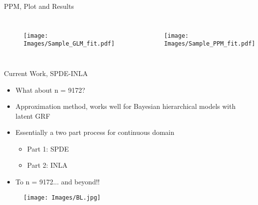 \documentclass{beamer}
\begin{document}
\begin{frame}{PPM, Plot and Results}

\begin{columns}

  \begin{figure}[H]
	\centering
	\texttt{[image: Images/Sample\_GLM\_fit.pdf]}
	\end{figure}
	
  \begin{figure}[H]
	\centering
	\texttt{[image: Images/Sample\_PPM\_fit.pdf]}
	\end{figure}

\end{columns}
\end{frame}

\begin{frame}{Current Work, SPDE-INLA}

\begin{itemize}
\addtolength{\itemsep}{0.5\baselineskip}
\item What about n = 9172?
\item Approximation method, works well for Bayesian hierarchical models with latent GRF
\item Essentially a two part process for continuous domain
  \begin{itemize}
  \item Part 1: SPDE
  \item Part 2: INLA
  \end{itemize}
\item To n = 9172... and beyond!!
\end{itemize}
  \begin{figure}[H]
	\centering
	\texttt{[image: Images/BL.jpg]}
	\end{figure}

\end{frame}
\end{document}
